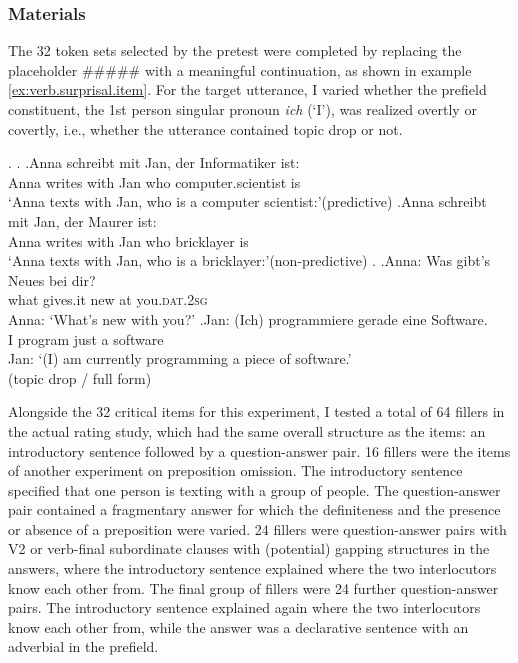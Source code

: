 \subsubsection{Materials}
The 32 token sets selected by the pretest were completed by replacing the placeholder \#\#\#\#\# with a meaningful continuation, as shown in example \ref{ex:verb.surprisal.item}.
For the target utterance, I varied whether the prefield constituent, the 1st person singular pronoun \textit{ich} (`I'), was realized overtly or covertly, i.e., whether the utterance contained topic drop or not.

\ex.\label{ex:verb.surprisal.item}
\a.\label{ex:verb.surprisal.item.context}
\ag.\label{ex:verb.surprisal.item.context.p}Anna schreibt mit Jan, der Informatiker ist:\\
Anna writes with Jan who computer.scientist is\\
`Anna texts with Jan, who is a computer scientist:'\hfill(predictive)
\bg.\label{ex:verb.surprisal.item.context.np}Anna schreibt mit Jan, der Maurer ist:\\
Anna writes with Jan who bricklayer is\\
`Anna texts with Jan, who is a bricklayer:'\hfill(non-predictive)
\z.
\bg.\label{ex:verb.surprisal.item.question}Anna: Was gibt's Neues bei dir?\\
{} what gives.it new at you.\textsc{dat.2sg}\\
Anna: `What's new with you?'
\cg.\label{ex:verb.surprisal.item.answer}Jan: (Ich) programmiere gerade eine Software.\\
{} I program just a software\\
Jan: `(I) am currently programming a piece of software.'\\\phantom{.}\hfill (topic drop / full form)

Alongside the 32 critical items for this experiment, I tested a total of 64 fillers in the actual rating study, which had the same overall structure as the items:
an introductory sentence followed by a question-answer pair.
16 fillers were the items of another experiment on preposition omission.
The introductory sentence specified that one person is texting with a group of people.
The question-answer pair contained a fragmentary answer for which the definiteness and the presence or absence of a preposition were varied.
24 fillers were question-answer pairs with V2 or verb-final subordinate clauses with (potential) gapping structures in the answers, where the introductory sentence explained where the two interlocutors know each other from.
The final group of fillers were 24 further question-answer pairs.
The introductory sentence explained again where the two interlocutors know each other from, while the answer was a declarative sentence with an adverbial in the prefield.


